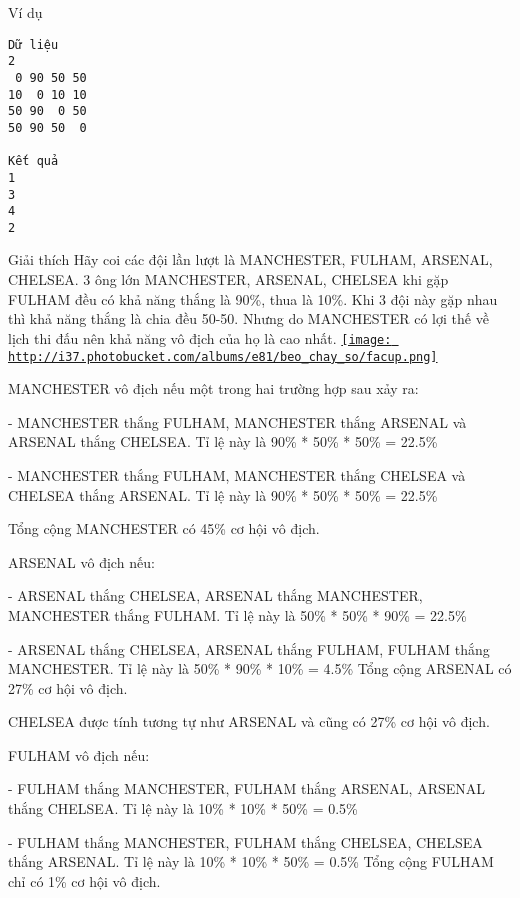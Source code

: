 Ví dụ  
\begin{verbatim}
Dữ liệu
2
 0 90 50 50
10  0 10 10
50 90  0 50
50 90 50  0

Kết quả
1
3
4
2
\end{verbatim}
   Giải thích  
Hãy coi các đội lần lượt là MANCHESTER, FULHAM, ARSENAL, CHELSEA. 3 ông lớn MANCHESTER, ARSENAL, CHELSEA khi gặp FULHAM đều có khả năng thắng là 90\%, thua là 10\%. Khi 3 đội này gặp nhau thì khả năng thắng là chia đều 50-50. Nhưng do MANCHESTER có lợi thế về lịch thi đấu nên khả năng vô địch của họ là cao nhất.  \href{http://s37.photobucket.com/albums/e81/beo_chay_so/?action=view¤t=facup.png}{
\texttt{[image: http://i37.photobucket.com/albums/e81/beo\_chay\_so/facup.png]}}

   MANCHESTER vô địch nếu một trong hai trường hợp sau xảy ra:  

   - MANCHESTER thắng FULHAM, MANCHESTER thắng ARSENAL và ARSENAL thắng CHELSEA. Tỉ lệ này là 90\% * 50\% * 50\% = 22.5\%  

   - MANCHESTER thắng FULHAM, MANCHESTER thắng CHELSEA và CHELSEA thắng ARSENAL. Tỉ lệ này là 90\% * 50\% * 50\% = 22.5\%  

   Tổng cộng MANCHESTER có 45\% cơ hội vô địch.  

   ARSENAL vô địch nếu:  

   - ARSENAL thắng CHELSEA, ARSENAL thắng MANCHESTER, MANCHESTER thắng FULHAM. Tỉ lệ này là 50\% * 50\% * 90\% = 22.5\%  

   - ARSENAL thắng CHELSEA, ARSENAL thắng FULHAM, FULHAM thắng MANCHESTER. Tỉ lệ này là 50\% * 90\% * 10\% = 4.5\% Tổng cộng ARSENAL có 27\% cơ hội vô địch.  

   CHELSEA được tính tương tự như ARSENAL và cũng có 27\% cơ hội vô địch.  

   FULHAM vô địch nếu:  

   - FULHAM thắng MANCHESTER, FULHAM thắng ARSENAL, ARSENAL thắng CHELSEA. Tỉ lệ này là 10\% * 10\% * 50\% = 0.5\%  

   - FULHAM thắng MANCHESTER, FULHAM thắng CHELSEA, CHELSEA thắng ARSENAL. Tỉ lệ này là 10\% * 10\% * 50\% = 0.5\% Tổng cộng FULHAM chỉ có 1\% cơ hội vô địch.